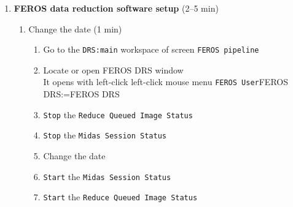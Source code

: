 \documentclass[11pt,fleqn]{book}
\makeatletter
\def\menu#1#2{\texttt{#1}\ifx{}#2\else\@for\@x:=#2\do{$\rightarrow$\texttt{\@x}}\fi}
\def\mmenu#1#2{left-click mouse menu \menu{#1}{#2}}
\def\procref#1{Procedure~\ref{proc:#1}, p.~\pageref{proc:#1}}
\def\figref#1{Fig.~\ref{fig:#1}, p.~\pageref{fig:#1}}
\makeatother
\begin{document}
\begin{enumerate}
\begin{enumerate}
\begin{enumerate}
                  \item A bias image should be seen within seconds
                  \item If it fails in the previous steps, go to \procref{restartgag} (3 min)
               \end{enumerate}
           \item Check the \gls{feros} autoguider (1--4 min)
               \begin{enumerate}
                  \item select  below \texttt{CCD change} (see \figref{agswitch})
                  \item If necessary, use \texttt{Start exposure} to change \texttt{CCD Status} to \texttt{Infinite loop}
                  \item Find window \texttt{E2P2 Real Time Display}
                  \item Click checkbox \texttt{Camera on/off} so that checkbox gets green
                  \item A bias image should be seen within seconds
                  \item Check that the image is horizontally flipped. 
                  \item If it fails in the previous steps, go to \procref{restartfag} (3 min)
               \end{enumerate}
        \end{enumerate}           
  \item\textbf{FEROS data reduction software setup} (2--5 min)
    \begin{enumerate}
        \item Change the date  (1 min)
        \label{list:drs}
		\begin{enumerate}
		  \item Go to the \texttt{DRS:main} workspace of screen \texttt{FEROS pipeline}
		  \item Locate or open FEROS DRS window\\
                It opens with left-click \mmenu{FEROS User}{FEROS DRS} 
		  \item \texttt{Stop} the \texttt{Reduce Queued Image Status}
		  \item \texttt{Stop} the \texttt{Midas Session Status}
		  \item Change the date 
		  \item \texttt{Start} the \texttt{Midas Session Status}
		  \item \texttt{Start} the \texttt{Reduce Queued Image Status}

\end{enumerate}
\end{enumerate}
\end{enumerate}
\end{document}
